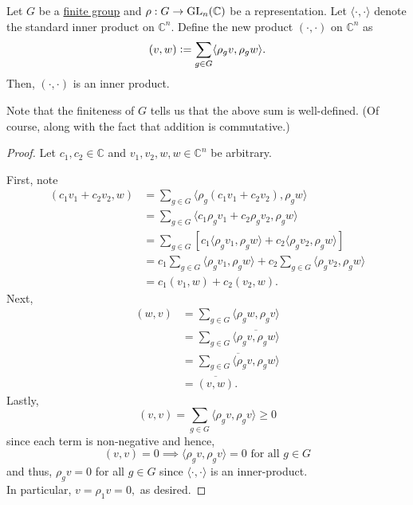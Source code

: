 \begin{lem} \label{lem:newinnerproduct}
	Let $G$ be a \underline{finite group} and $\rho:G \to \operatorname{GL}_n(\mathbb{C})$ be a representation. Let $\langle \cdot, \cdot\rangle$ denote the standard inner product on $\mathbb{C}^n.$ Define the new product $(\cdot, \cdot)$ on $\mathbb{C}^n$ as
	\begin{equation*} 
		(v, w) \vcentcolon= \sum_{g \in G} \langle \rho_gv, \rho_gw\rangle.
	\end{equation*}
	Then, $(\cdot, \cdot)$ is an inner product.
\end{lem}
Note that the finiteness of $G$ tells us that the above sum is well-defined. (Of course, along with the fact that addition is commutative.)
\begin{proof} 
	Let $c_1, c_2 \in \mathbb{C}$ and $v_1, v_2, w, w \in \mathbb{C}^n$ be arbitrary.

	First, note
	\begin{align*} 
		(c_1v_1 + c_2v_2, w) &= \sum_{g \in G} \langle \rho_g(c_1v_1 + c_2v_2), \rho_gw\rangle\\
		&= \sum_{g \in G} \langle c_1\rho_gv_1 + c_2\rho_gv_2, \rho_gw\rangle\\
		&= \sum_{g \in G} \left[c_1\langle \rho_gv_1, \rho_gw\rangle + c_2\langle \rho_gv_2, \rho_gw\rangle\right]\\
		&= c_1\sum_{g \in G} \langle \rho_gv_1, \rho_gw\rangle + c_2\sum_{g \in G} \langle \rho_gv_2, \rho_gw\rangle\\
		&= c_1(v_1, w) + c_2(v_2, w).
	\end{align*}
	Next, 
	\begin{align*} 
		(w, v) &= \sum_{g \in G} \langle \rho_gw, \rho_gv\rangle\\
		&= \sum_{g \in G} \overline{\langle \rho_gv, \rho_gw\rangle}\\
		&= \overline{\sum_{g \in G} \langle \rho_gv, \rho_gw\rangle}\\
		&= \overline{(v, w)}.
	\end{align*}
	Lastly,
	\begin{equation*} 
		(v, v) = \sum_{g \in G} \langle \rho_gv, \rho_gv\rangle \ge 0
	\end{equation*}
	since each term is non-negative and hence,
	\begin{equation*} 
		(v, v) = 0 \implies \langle \rho_gv, \rho_gv\rangle = 0 \text{ for all } g \in G
	\end{equation*}
	and thus, $\rho_gv = 0$ for all $g \in G$ since $\langle \cdot, \cdot\rangle$ is an inner-product.\\
	In particular, $v = \rho_1v = 0,$ as desired.
\end{proof}

